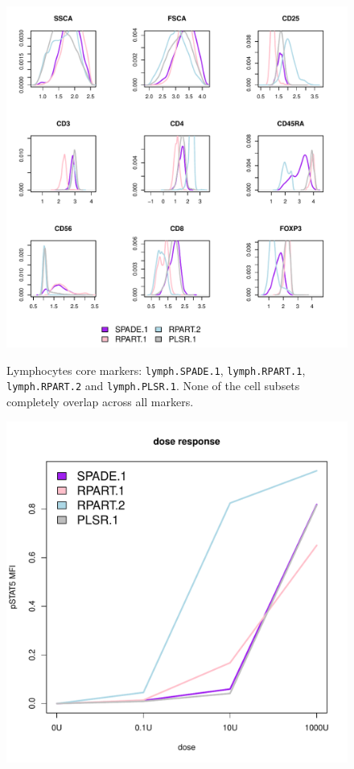 \begin{figure}
\centering
\begin{minipage}{.65\textwidth}
    \includegraphics[width=\linewidth]{figures/final-lymphocytes-clusters}
\end{minipage}
{ Lymphocytes core markers: \texttt{lymph.SPADE.1}, \texttt{lymph.RPART.1}, \texttt{lymph.RPART.2} and \texttt{lymph.PLSR.1}. }
{ 
    None of the cell subsets completely overlap across all markers.
}
\begin{minipage}{.5\textwidth}
    \includegraphics[scale=0.4]{figures/final-lymphocytes-dose-response}

\end{minipage}
\end{figure}
